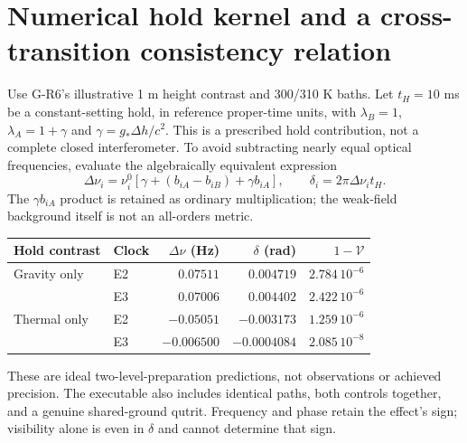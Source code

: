 \documentclass[11pt,a4paper]{article}
\begin{document}
\section{Numerical hold kernel and a cross-transition consistency relation}
Use G-R6's illustrative 1 m height contrast and 300/310 K baths.
Let $t_H=10$ ms be a constant-setting hold, in reference proper-time
units, with $\lambda_B=1$, $\lambda_A=1+\gamma$ and
$\gamma=g_*\Delta h/c^2$. This is a prescribed hold contribution, not a
complete closed interferometer. To avoid subtracting nearly equal
optical frequencies, evaluate the algebraically equivalent expression
\begin{equation}
 \Delta\nu_i=\nu_i^0[\gamma+(b_{iA}-b_{iB})+\gamma b_{iA}],
 \qquad \delta_i=2\pi\Delta\nu_i t_H.
\end{equation}
The $\gamma b_{iA}$ product is retained as ordinary multiplication;
the weak-field background itself is not an all-orders metric.
\begin{center}
\begin{tabular}{llrrr}
\toprule
Hold contrast & Clock & $\Delta\nu$ (Hz) & $\delta$ (rad) & $1-\mathcal V$\\
\midrule
Gravity only & E2 & $0.07511$ & $0.004719$ & $2.784\,10^{-6}$\\
 & E3 & $0.07006$ & $0.004402$ & $2.422\,10^{-6}$\\
Thermal only & E2 & $-0.05051$ & $-0.003173$ & $1.259\,10^{-6}$\\
 & E3 & $-0.006500$ & $-0.0004084$ & $2.085\,10^{-8}$\\
\bottomrule
\end{tabular}
\end{center}
These are ideal two-level-preparation predictions, not observations
or achieved precision. The executable also includes identical paths,
both controls together, and a genuine shared-ground qutrit.
Frequency and phase retain the effect's sign; visibility alone is even
in $\delta$ and cannot determine that sign.
\end{document}
